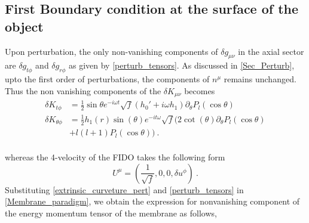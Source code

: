 \documentclass[aps,prd,twocolumn,floatfix,noshowpacs,tightenlines,noshowkeys,superscriptaddress,amsmath,amssymb,
nofootinbib]{revtex4-1}
\renewcommand\[{\begin{equation}}
\renewcommand\]{\end{equation}}
\begin{document}
\subsection{First Boundary condition at the surface of the object}\label{App_boundary_condi}

Upon perturbation, the only non-vanishing components of $\delta g_{\mu\nu}$ in the axial sector are $\delta g_{t\phi}$ and $\delta g_{r\phi}$ as given by \autoref{perturb_tensors}. As discussed in \autoref{Sec_Perturb}, upto the first order of perturbations, the components of $n^\mu$ remains unchanged. Thus the non vanishing components  of the $\delta K_{\mu\nu}$ becomes
\begin{equation}\label{extrinsic_curveture_pert}
	\begin{aligned}
			\delta K_{t\phi}&=\frac{1}{2}\sin \theta e^{-i  \omega t} \sqrt{f}\left(h_0'+i \omega  h_1\right) \partial_\theta P_l(\cos\theta )\\ 
		\delta K_{\theta\phi}&=\frac{1}{2} h_1(r) \sin (\theta ) e^{-i t \omega } \sqrt{f}\bigg(2 \cot (\theta ) \partial_\theta P_l(\cos\theta)\\& +l (l+1) P_l(\cos\theta )\bigg)~.
	\end{aligned}
\end{equation}
\\
 whereas the 4-velocity of the FIDO takes the following form
\begin{equation}\label{pert_velocity}
U^\mu=(\dfrac{1}{\sqrt{f}},0,0,\delta u^\phi)~.
\end{equation}
Substituting \autoref{extrinsic_curveture_pert} and \autoref{perturb_tensors} in \autoref{Membrane_paradigm}, we obtain the expression for nonvanishing component of the energy momentum tensor of the membrane as follows,
\end{document}
